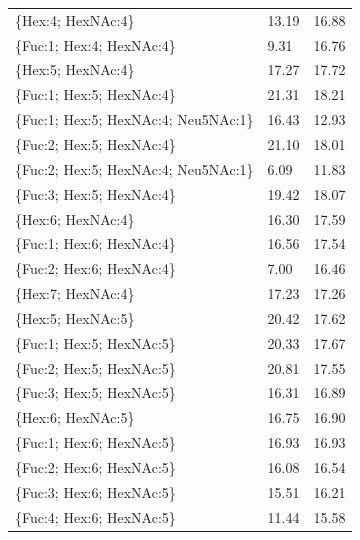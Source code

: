 \begin{table}
\begin{minipage}[t]{0.55\linewidth}
\begin{footnotesize}
\begin{tabular}{l|p{2cm} p{2cm}}
\{Hex:4; HexNAc:4\}                   &                13.19 &              16.88 \\
\{Fuc:1; Hex:4; HexNAc:4\}            &                 9.31 &              16.76 \\
\{Hex:5; HexNAc:4\}                   &                17.27 &              17.72 \\
\{Fuc:1; Hex:5; HexNAc:4\}            &                21.31 &              18.21 \\
\{Fuc:1; Hex:5; HexNAc:4; Neu5NAc:1\} &                16.43 &              12.93 \\
\{Fuc:2; Hex:5; HexNAc:4\}            &                21.10 &              18.01 \\
\{Fuc:2; Hex:5; HexNAc:4; Neu5NAc:1\} &                 6.09 &              11.83 \\
\{Fuc:3; Hex:5; HexNAc:4\}            &                19.42 &              18.07 \\
\{Hex:6; HexNAc:4\}                   &                16.30 &              17.59 \\
\{Fuc:1; Hex:6; HexNAc:4\}            &                16.56 &              17.54 \\
\{Fuc:2; Hex:6; HexNAc:4\}            &                 7.00 &              16.46 \\
\{Hex:7; HexNAc:4\}                   &                17.23 &              17.26 \\
\{Hex:5; HexNAc:5\}                   &                20.42 &              17.62 \\
\{Fuc:1; Hex:5; HexNAc:5\}            &                20.33 &              17.67 \\
\{Fuc:2; Hex:5; HexNAc:5\}            &                20.81 &              17.55 \\
\{Fuc:3; Hex:5; HexNAc:5\}            &                16.31 &              16.89 \\
\{Hex:6; HexNAc:5\}                   &                16.75 &              16.90 \\
\{Fuc:1; Hex:6; HexNAc:5\}            &                16.93 &              16.93 \\
\{Fuc:2; Hex:6; HexNAc:5\}            &                16.08 &              16.54 \\
\{Fuc:3; Hex:6; HexNAc:5\}            &                15.51 &              16.21 \\
\{Fuc:4; Hex:6; HexNAc:5\}            &                11.44 &              15.58 \\

\end{tabular}
\end{footnotesize}
\end{minipage}
\end{table}
